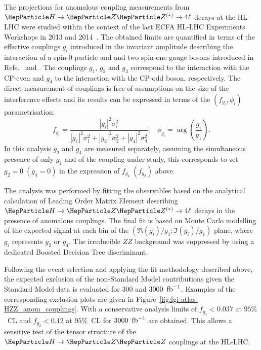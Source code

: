 
The projections for anomalous coupling measurements from $\hzzllll$ decays at the HL-LHC were studied within the context of the last ECFA HL-LHC Experiments Workshops in 2013 and 2014~\cite{ATL-PHYS-PUB-2013-013}.
The obtained limits are quantified 
in terms of the effective couplings $g_i$  introduced in the invariant amplitude describing the interaction of a spin-0 particle and and two spin-one gauge bosons
introduced in Refs.~\cite{Gao:2010qx} and \cite{Heinemeyer:2013tqa}. The couplings $g_1$, $g_2$ and $g_3$ correspond to the 
interaction with the CP-even and $g_4$ to the interaction with the CP-odd boson, respectively.
The direct measurement of couplings is free of assumptions on the size of the interference effects and its results can be 
expressed in terms of the $(f_{g_i}, \phi_i)$ parametrisation:
$$
f_{g_i} =\frac{|g_i|^2 \sigma _i ^2}{|g_1|^2 \sigma _1 ^2 + |g_2|^2 \sigma _2 ^2 + |g_4|^2 \sigma _4 ^2}; \;\;\; \phi _{g_i} = \arg \left ( \frac{g_i}{g_1} \right ).
$$
In this analysis $g_2$ and $g_4$ are measured separately, assuming the simultaneous presence of
only $g_1$ and of the coupling under study, this corresponds to set $g_2 = 0\; (g_4 = 0)$ in the expression of $f_{g_4}\;
( f_{g_2} )$ above.

The analysis was performed by fitting the observables based on the analytical calculation of Leading Order Matrix Element describing 
 $\hzzllll$ decays in the presence of anomalous couplings. The final fit is based on Monte Carlo modelling of the expected
signal at each bin of the $(\Re (g_i)/g_1; \Im (g_i) /g_1)$ plane, where $g_i$ represents $g_2$ or $g_4$. The irreducible $ZZ$ background 
 was suppressed by using a dedicated Boosted Decision Tree discriminant.  
 
 
Following the event selection and applying the fit methodology described above, the expected exclusion
of the non-Standard Model contributions given the Standard Model data is evaluated for $300$ and $3000~\mbox{\ensuremath{\,\text{fb}^\text{$-$1}}}$.
Examples of the corresponding exclusion plots are given in Figure~\ref{fig:fgi-atlas-HZZ_anom_couplings}. With a conservative analysis limits of $f_{g_4} < 0.037$ at $95\%$~CL and 
$f_{g_2} < 0.12$ at $95\%$~CL for $3000~\mbox{\ensuremath{\,\text{fb}^\text{$-$1}}}$ are obtained. This allows a sensitive test of the tensor structure of the $\hzz$ couplings at the HL-LHC.

